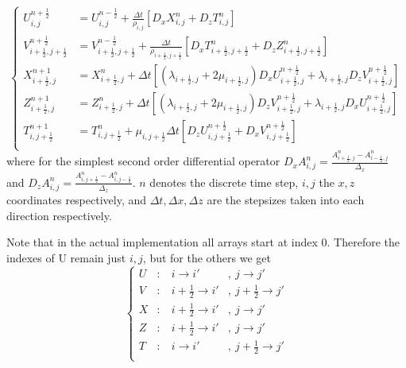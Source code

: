 \documentclass[fleqn,11pt]{SelfArx} %
\theoremstyle{definition}
\begin{document}
\begin{equation}
\left\{
\begin{split}
U_{i,j}^{n+\frac{1}{2}}  &= U_{i,j}^{n-\frac{1}{2}} + \frac{\Delta t}{\rho_{i,j}}\left[ D_xX_{i,j}^n + D_zT^n_{i,j}\right] \\
V_{i+\frac{1}{2},j+\frac{1}{2}}^{n+\frac{1}{2}}  &= V_{i+\frac{1}{2},j+\frac{1}{2}}^{n-\frac{1}{2}} + \frac{\Delta t}{\rho_{i+\frac{1}{2},j+\frac{1}{2}}}\left[ D_xT_{i+\frac{1}{2},j+\frac{1}{2}}^n + D_zZ^n_{i+\frac{1}{2},j+\frac{1}{2}}\right] \\
X_{i+\frac{1}{2},j}^{n+1}  &= X_{i+\frac{1}{2},j}^{n} + \Delta t\left[ \left(\lambda_{i+\frac{1}{2},j} + 2 \mu_{i+\frac{1}{2},j}\right)D_xU_{i+\frac{1}{2},j}^{n+\frac{1}{2}} + \lambda_{i+\frac{1}{2},j} D_zV^{n+\frac{1}{2}}_{i+\frac{1}{2},j}\right] \\
Z_{i+\frac{1}{2},j}^{n+1}  &= Z_{i+\frac{1}{2},j}^{n} + \Delta t\left[ \left(\lambda_{i+\frac{1}{2},j} + 2 \mu_{i+\frac{1}{2},j}\right)D_zV_{i+\frac{1}{2},j}^{n+\frac{1}{2}} + \lambda_{i+\frac{1}{2},j} D_xU^{n+\frac{1}{2}}_{i+\frac{1}{2},j}\right] \\
T_{i,j+\frac{1}{2}}^{n+1}  &= T_{i,j+\frac{1}{2}}^{n} + \mu_{i,j+\frac{1}{2}}\Delta t\left[ D_zU_{i,j+\frac{1}{2}}^{n+\frac{1}{2}} + D_xV^{n+\frac{1}{2}}_{i,j+\frac{1}{2}}\right] \\
\end{split}\right.
\end{equation}
where for the simplest second order differential operator $D_x A^n_{i,j} = \frac{A^n_{i+\frac{1}{2},j} - A^n_{i-\frac{1}{2},j}}{\Delta_x}$ and $D_z A^n_{i,j} = \frac{A^n_{i,j+\frac{1}{2}} - A^n_{i,j-\frac{1}{2}}}{\Delta_z}$. $n$ denotes the discrete time step, $i,j$ the $x,z$ coordinates respectively, and $\Delta t, \Delta x, \Delta z$ are the stepsizes taken into each direction respectively.

Note that in the actual implementation all arrays start at index 0. Therefore the indexes of U remain just $i,j$, but for the others we get 
\begin{equation}
\left\{
\begin{split}
U &: \  & i \rightarrow i' &,\ j \rightarrow j' \\ 
V &: \  & i +\frac{1}{2} \rightarrow i' &,\ j +\frac{1}{2} \rightarrow j' \\ 
X &: \  & i +\frac{1}{2} \rightarrow i' &,\ j \rightarrow j' \\ 
Z &: \  & i +\frac{1}{2} \rightarrow i' &,\ j \rightarrow j' \\ 
T &: \  & i \rightarrow i' &,\ j +\frac{1}{2} \rightarrow j' \\ 
\end{split}\right.
\end{equation}
\end{document}
